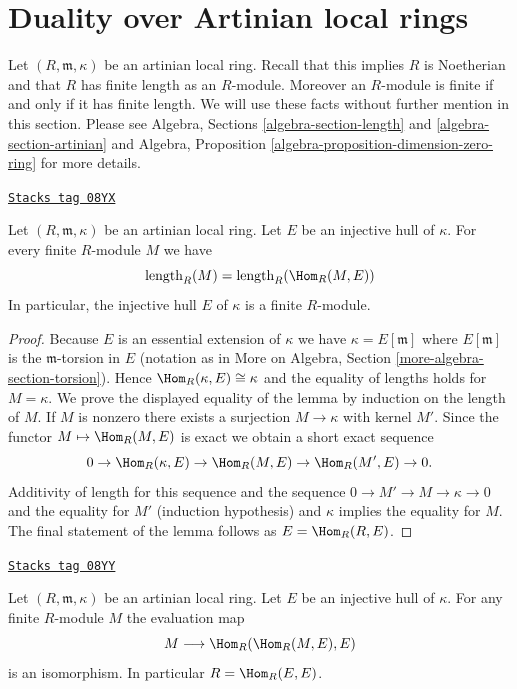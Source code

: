 \section{Duality over Artinian local rings}
\label{dualizing-section-artinian}
Let $(R, \mathfrak m, \kappa)$ be an artinian local ring.
Recall that this implies $R$ is Noetherian and that $R$ has finite
length as an $R$-module. Moreover an $R$-module is finite if and
only if it has finite length. We will use these facts without
further mention in this section. Please see
Algebra, Sections \ref{algebra-section-length} and
\ref{algebra-section-artinian}
and
Algebra, Proposition \ref{algebra-proposition-dimension-zero-ring}
for more details.

\begin{lemma}[Finite]
\label{dualizing-lemma-finite}
\href{https://stacks.math.columbia.edu/tag/08YX}{\texttt{Stacks tag 08YX}}

Let $(R, \mathfrak m, \kappa)$ be an artinian local ring.
Let $E$ be an injective hull of $\kappa$. For every finite
$R$-module $M$ we have
$$
\text{length}_R(M) = \text{length}_R(\Hom_R(M, E))
$$
In particular, the injective hull $E$ of $\kappa$ is a finite $R$-module.
\end{lemma}

\begin{proof}
Because $E$ is an essential extension of $\kappa$ we have
$\kappa = E[\mathfrak m]$ where $E[\mathfrak m]$ is the
$\mathfrak m$-torsion in $E$ (notation as in More on Algebra, Section
\ref{more-algebra-section-torsion}).
Hence $\Hom_R(\kappa, E) \cong \kappa$ and the equality of lengths
holds for $M = \kappa$. We prove the displayed equality of the lemma
by induction on the length of $M$. If $M$ is nonzero there exists a surjection
$M \to \kappa$ with kernel $M'$. Since the functor $M \mapsto \Hom_R(M, E)$
is exact we obtain a short exact sequence
$$
0 \to \Hom_R(\kappa, E) \to \Hom_R(M, E) \to \Hom_R(M', E) \to 0.
$$
Additivity of length for this sequence and the sequence
$0 \to M' \to M \to \kappa \to 0$ and the equality for $M'$ (induction
hypothesis) and $\kappa$ implies the equality for $M$.
The final statement of the lemma follows as $E = \Hom_R(R, E)$.
\end{proof}

\begin{lemma}[Evaluate]
\label{dualizing-lemma-evaluate}
\href{https://stacks.math.columbia.edu/tag/08YY}{\texttt{Stacks tag 08YY}}

Let $(R, \mathfrak m, \kappa)$ be an artinian local ring.
Let $E$ be an injective hull of $\kappa$.
For any finite $R$-module $M$ the evaluation map
$$
M \longrightarrow \Hom_R(\Hom_R(M, E), E)
$$
is an isomorphism. In particular $R = \Hom_R(E, E)$.
\end{lemma}

